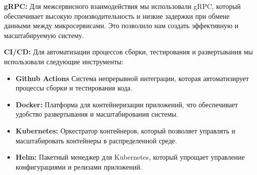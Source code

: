 \textbf{gRPC:}
Для межсервисного взаимодействия мы использовали gRPC, который обеспечивает высокую производительность и низкие задержки при обмене данными между микросервисами. Это позволило нам создать эффективную и масштабируемую систему.

\textbf{CI/CD:}
Для автоматизации процессов сборки, тестирования и развертывания мы использовали следующие инструменты:
\begin{itemize}
    \item \textbf{Github Actions} Система непрерывной интеграции, которая автоматизирует процессы сборки и тестирования кода.
    \item \textbf{Docker:} Платформа для контейнеризации приложений, что обеспечивает удобство развертывания и масштабирования системы.
    \item \textbf{Kubernetes:} Оркестратор контейнеров, который позволяет управлять и масштабировать контейнеры в распределенной среде.
    \item \textbf{Helm:} Пакетный менеджер для Kubernetes, который упрощает управление конфигурациями и релизами приложений.
\end{itemize}